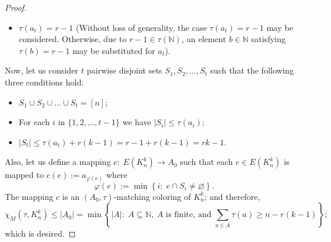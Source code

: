 \documentclass[11pt]{amsart}
\theoremstyle{definition}
\begin{document}
\begin{proof}
\begin{itemize}
		\item $\tau(a_{t})=r-1$ (Without loss of generality, the case 
		$\tau(a_{t})=r-1$
		may be considered. Otherwise, due to
		$r-1\in\tau(\mathbb{N})$, an element
		$b \in \mathbb{N}$ satisfying $\tau(b)=r-1$
		may be substituted for 
		$a_{t}$).
	\end{itemize}
	Now, let us consider $t$ pairwise disjoint sets $S_1, S_2, \ldots, S_t$ such that
	the following three conditions hold:
	\begin{itemize}
		\item $S_{1} \cup S_{2} \cup \dots \cup S_{t}=[n]$;
		\item For each $i$ in $\{1,2,\ldots ,t-1\}$ we have $|S_i|\leq \tau (a_i)$;
		\item $ |S_{t}| \leq \tau (a_t) + r(k-1) = r-1 + r(k-1)=rk-1$.
	\end{itemize}
	Also, let us define a mapping $c:\; E\left(K_n^k\right)\longrightarrow A_0$ such that each $e\in E\left(K_n^k\right)$ is mapped to $c(e):=a_{\varphi (e)}$ where
	$$ \varphi (e) := \min \left\{i:\; e\cap S_i\neq \varnothing \right\} . $$
	The mapping $c$ is an $\left(A_0 ,\tau \right)$-matching coloring of $K_n^k$; and therefore,
	$$\chi_M\left(\tau,K_n^k\right)\leq \left| A_0 \right| = \min \left\{|A|:\; A\subseteq \mathbb{N},\ A \mbox{ is finite, and } \sum_{a\in A}\tau(a) \geq  n-r(k-1)\right\} ;$$
	which is desired.
\end{proof}





\def\cprime{$'$} \def\cprime{$'$}



\end{document}

